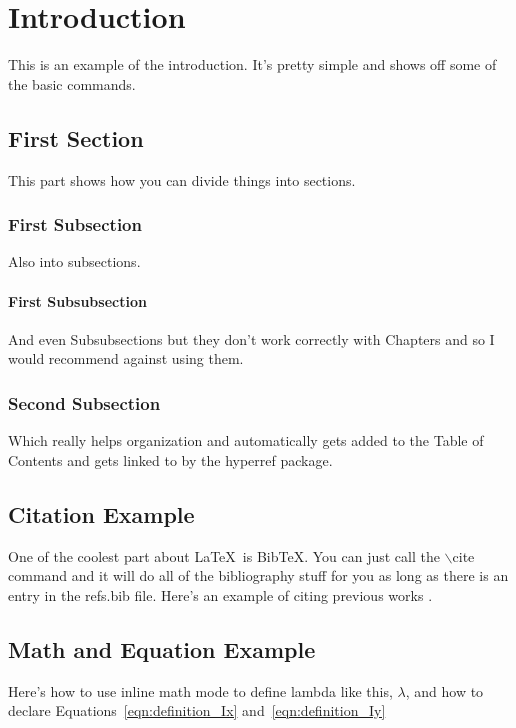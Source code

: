 
\chapter{Introduction}
This is an example of the introduction. It's pretty simple and shows off
some of the basic commands.

\section{First Section}
This part shows how you can divide things into sections.

\subsection{First Subsection}
Also into subsections.

\subsubsection{First Subsubsection}
And even Subsubsections but they don't work correctly with Chapters and so I
would recommend against using them.

\subsection{Second Subsection}
Which really helps organization and automatically gets added to the Table
of Contents and gets linked to by the hyperref package.

\section{Citation Example}
One of the coolest part about \LaTeX\ is BibTeX. You can just call
the $\backslash$cite command and it will do all of the bibliography
stuff for you as long as there is an entry in the refs.bib file.
Here's an example of citing previous works
\cite{SomeSweetBook06,SomeSweetArticle06}.

\section{Math and Equation Example}
Here's how to use inline math mode to define lambda like this,
$\lambda$, and how to declare Equations~\eqref{eqn:definition_Ix}
and~\eqref{eqn:definition_Iy}

